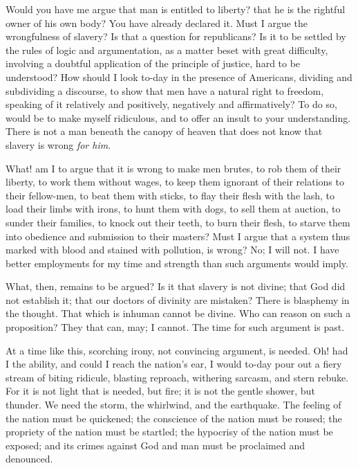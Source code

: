 Would you have me argue that man is entitled to liberty? that he is
the rightful owner of his own body? You have already declared it. Must
I argue the wrongfulness of slavery? Is that a question for
republicans? Is it to be settled by the rules of logic and
argumentation, as a matter beset with great difficulty, involving a
doubtful application of the principle of justice, hard to be
understood? How should I look to-day in the presence of Americans,
dividing and subdividing a discourse, to show that men have a natural
right to freedom, speaking of it relatively and positively, negatively
and affirmatively? To do so, would be to make myself ridiculous, and
to offer an insult to your understanding. There is not a man beneath
the canopy of heaven that does not know that slavery is wrong
\textit{for him}.

What! am I to argue that it is wrong to make men brutes, to rob them
of their liberty, to work them without wages, to keep them ignorant of
their relations to their fellow-men, to beat them with sticks, to flay
their flesh with the lash, to load their limbs with irons, to hunt
them with dogs, to sell them at auction, to sunder their families, to
knock out their teeth, to burn their flesh, to starve them into
obedience and submission to their masters? Must I argue that a system
thus marked with blood and stained with pollution, is wrong? No; I
will not. I have better employments for my time and strength than such
arguments would imply.

What, then, remains to be argued? Is it that slavery is not divine;
that God did not establish it; that our doctors of divinity are
mistaken? There is blasphemy in the thought. That which is inhuman
cannot be divine. Who can reason on such a proposition? They that can,
may; I cannot. The time for such argument is past.

At a time like this, scorching irony, not convincing argument, is
needed. Oh! had I the ability, and could I reach the nation's ear, I
would to-day pour out a fiery stream of biting ridicule, blasting
reproach, withering sarcasm, and stern rebuke. For it is not light
that is needed, but fire; it is not the gentle shower, but thunder. We
need the storm, the whirlwind, and the earthquake.  The
feeling of the nation must be quickened; the conscience of the nation
must be roused; the propriety of the nation must be startled; the
hypocrisy of the nation must be exposed; and its crimes against God
and man must be proclaimed and denounced.

